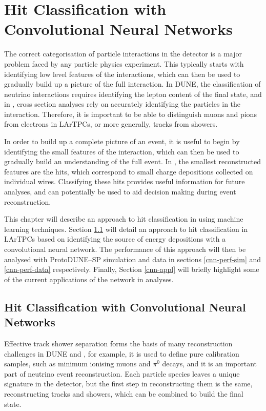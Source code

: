 \chapter{\label{ch:chargeid}Hit Classification with Convolutional Neural Networks} 

\minitoc

The correct categorisation of particle interactions in the detector is a major
problem faced by any particle physics experiment. This typically starts with
identifying low level features of the interactions, which can then be used to
gradually build up a picture of the full interaction. In DUNE, the
classification of neutrino interactions requires identifying the lepton content
of the final state, and in \protodune{}, cross section analyses rely on
accurately identifying the particles in the interaction. Therefore, it is
important to be able to distinguish muons and pions from electrons in LArTPCs, 
or more generally, tracks from showers.

In order to build up a complete picture of an event, it is useful to begin by
identifying the small features of the interaction, which can then be used to
gradually build an understanding of the full event. In \protodune{}, the
smallest reconstructed features are the hits, which correspond to small charge 
depositions collected on individual wires. Classifying these hits provides
useful information for future analyses, and can potentially be used to aid
decision making during event reconstruction.

This chapter will describe an approach to hit classification in \protodune{} 
using machine learning techniques. Section \ref{hit-id} will detail an 
approach to hit classification in LArTPCs based on identifying the source of 
energy depositions with a convolutional neural network.  The performance of 
this approach will then be analysed with ProtoDUNE--SP simulation and data in 
sections \ref{cnn-perf-sim} and \ref{cnn-perf-data} respectively. Finally,
Section \ref{cnn-appl} will briefly highlight some of the current applications 
of the network in \protodune{} analyses.

\section{Hit Classification with Convolutional Neural Networks} \label{hit-id}

Effective track shower separation forms the basis of many reconstruction
challenges in DUNE and \protodune{}, for example, it is used to define pure 
calibration samples, such as minimum ionising muons and $\pi^0$ decays, and it 
is an important part of neutrino event reconstruction. Each particle species 
leaves a unique signature in the detector, but the first step in reconstructing 
them is the same, reconstructing tracks and showers, which can be combined to 
build the final state. 

